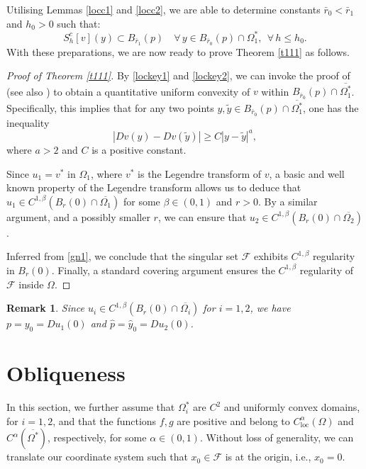\documentclass[11pt]{amsart}
\theoremstyle{plain}
\newtheorem{remark}{Remark}[section]
\newcommand{\0}{\textbf{0}}
\numberwithin{equation}{section}
\numberwithin{equation}{section}
\numberwithin{figure}{section}
\begin{document}
Utilising Lemmas \ref{locc1} and \ref{locc2}, we are able to determine constants \( \bar r_0 < \bar r_1 \) and \( h_0 > 0 \) such that:
\begin{equation}\label{lockey2}
S_h^c[v](y) \subset B_{\bar r_1}(p)  \quad \forall\, y \in B_{\bar r_0}(p) \cap \Omega_1^*, \ \  \forall\, h \leq h_0.
\end{equation}
With these preparations, we are now ready to prove Theorem \ref{t111} as follows.
\begin{proof}[Proof of Theorem \ref{t111}]
By \eqref{lockey1} and \eqref{lockey2}, we can invoke the proof of \cite[Lemma 2.2, Corollary 2.3]{C96} (see also \cite[Theorem 7.13]{CM}) to obtain a quantitative uniform convexity of $v$ within $B_{\bar{r}_0}(p)\cap \overline{\Omega_1^*}$. Specifically, this implies that for any two points $y, \tilde{y} \in B_{\bar{r}_0}(p) \cap \overline{\Omega_1^*}$, one has the inequality 
	$$ |Dv(y) - Dv(\tilde{y})| \geq C|y - \tilde{y}|^a,$$ 
where $a > 2$ and $C$ is a positive constant.

Since $u_1 = v^*$ in $\Omega_1$, where $v^*$ is the Legendre transform of $v$, a basic and well known property of the Legendre transform \cite[Remark 7.10]{CM} allows us to deduce that $u_1 \in C^{1,\beta}(B_r(0) \cap \overline{\Omega_1})$ for some $\beta \in (0, 1)$ and $r > 0$. 
By a similar argument, and a possibly smaller $r$, we can ensure that $u_2 \in C^{1,\beta}(B_r(0) \cap \overline{\Omega_2})$.

Inferred from \eqref{gn1}, we conclude that the singular set $\mathcal{F}$ exhibits $C^{1,\beta}$ regularity in $B_r(0)$. Finally, a standard covering argument ensures the $C^{1,\beta}$ regularity of $\mathcal{F}$ inside $\Omega$.
\end{proof}

\begin{remark}
\emph{
Since \( u_i \in C^{1,\beta}(B_r(0) \cap \overline{\Omega_i}) \) for \( i = 1, 2 \), we have \( p = y_0 = Du_1(0) \) and \( \hat{p} = \hat{y}_0 = Du_2(0)\).
}
\end{remark}





\section{Obliqueness}\label{S4}


In this section, we further assume that $\Omega^*_i$ are $C^2$ and uniformly convex domains, for $i = 1, 2$, and that the functions $f, g$ are positive and belong to $C^\alpha_{\text{loc}}(\Omega)$ and $C^\alpha(\overline{\Omega^*})$, respectively, for some $\alpha\in(0,1)$. Without loss of generality, we can translate our coordinate system such that $x_0 \in \mathcal{F}$ is at the origin, i.e., $x_0 = 0$.
\end{document}
